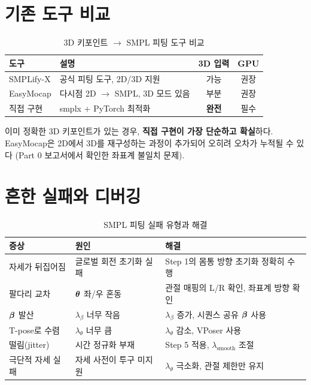 \documentclass[11pt, a4paper]{report}
\begin{document}
\section{기존 도구 비교}

\begin{table}[H]
\centering
\caption{3D 키포인트 $\rightarrow$ SMPL 피팅 도구 비교}
\renewcommand{\arraystretch}{1.3}
\begin{tabularx}{\textwidth}{lXcc}
\toprule
\textbf{도구} & \textbf{설명} & \textbf{3D 입력} & \textbf{GPU} \\
\midrule
SMPLify-X & 공식 피팅 도구, 2D/3D 지원 & 가능 & 권장 \\
EasyMocap & 다시점 2D $\rightarrow$ SMPL, 3D 모드 있음 & 부분 & 권장 \\
직접 구현 & smplx + PyTorch 최적화 & \textbf{완전} & 필수 \\
\bottomrule
\end{tabularx}
\end{table}

\begin{keyidea}
이미 정확한 3D 키포인트가 있는 경우, \textbf{직접 구현이 가장 단순하고 확실}하다.
EasyMocap은 2D에서 3D를 재구성하는 과정이 추가되어 오히려 오차가 누적될 수 있다
(Part 0 보고서에서 확인한 좌표계 불일치 문제).
\end{keyidea}


\section{흔한 실패와 디버깅}

\begin{table}[H]
\centering
\caption{SMPL 피팅 실패 유형과 해결}
\renewcommand{\arraystretch}{1.4}
\begin{tabularx}{\textwidth}{lXX}
\toprule
\textbf{증상} & \textbf{원인} & \textbf{해결} \\
\midrule
자세가 뒤집어짐 & 글로벌 회전 초기화 실패 & Step 1의 몸통 방향 초기화 정확히 수행 \\
팔다리 교차 & $\bm{\theta}$ 좌/우 혼동 & 관절 매핑의 L/R 확인, 좌표계 방향 확인 \\
$\bm{\beta}$ 발산 & $\lambda_\beta$ 너무 작음 & $\lambda_\beta$ 증가, 시퀀스 공유 $\bm{\beta}$ 사용 \\
T-pose로 수렴 & $\lambda_\theta$ 너무 큼 & $\lambda_\theta$ 감소, VPoser 사용 \\
떨림(jitter) & 시간 정규화 부재 & Step 5 적용, $\lambda_{\text{smooth}}$ 조절 \\
극단적 자세 실패 & 자세 사전이 투구 미지원 & $\lambda_\theta$ 극소화, 관절 제한만 유지 \\
\bottomrule
\end{tabularx}
\end{table}
\end{document}
